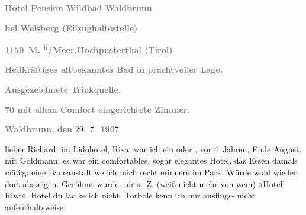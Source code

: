 \pstart
           \textcolor{gray}{\textbf{Hôtel {\kaufmannsund} Pension Wildbad Waldbrunn}}\pend
           
\pstart
           \textcolor{gray}{\textbf{bei Welsberg
                     (Eilzughaltestelle)}}\pend
           
\pstart
           \textcolor{gray}{\textbf{1150 M. \textsuperscript{ü}/Meer.\hspace*{1.5em}Hochpusterthal (Tirol)}}\pend
           
\pstart
           \textcolor{gray}{\textbf{Heilkräftiges altbekanntes Bad in prachtvoller Lage.}}\pend
           
\pstart
           \textcolor{gray}{\textbf{Ausgezeichnete Trinkquelle.}}\pend
           
\pstart
           \textcolor{gray}{\textbf{70 mit allem Comfort eingerichtete Zimmer.}}\pend
           
\pstart
           \raggedleft{}\textcolor{gray}{\textbf{Waldbrunn, den}}{ }29. 7. \textcolor{gray}{\textbf{190}}7\pend
           
\pstart{}lieber Richard,\pend\vspace{0.5em}
\pstart
           im Lidohotel, Riva, war ich ein oder \label{K_L01695-1v}\label{K_L01695-1}, vor 4 Jahren, Ende August, mit Goldmann; es war ein comfortables, sogar elegantes Hotel, das
               Essen damals mäßig; eine Badeanstalt we{\geminationn} ich mich recht
               erinnere im Park. Würde wohl wieder dort absteigen. Gerühmt wurde mir s. Z. (weiß
               nicht mehr von wem) »Hotel Riva«. Hotel du lac ke{\geminationn}
               ich nicht. Torbole kenn ich nur ausflugs- nicht
               aufenthaltsweise.\pend
           

